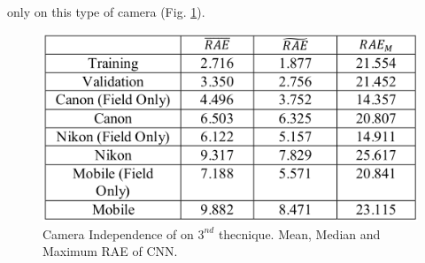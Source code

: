 \begin{enumerate}
    only on this type of camera (Fig. \ref{fig:CNNtec3}).
    \begin{figure}[h!]
        \centering
        \includegraphics[width = 0.6 \linewidth]{images/paper4/CNNtec3.png}
        \centering
        \caption{Camera Independence of \cite{0807099122} on $ 3^{nd} $ thecnique. Mean, Median and Maximum RAE of CNN.}
        \label{fig:CNNtec3}
    \end{figure}
\end{enumerate}

